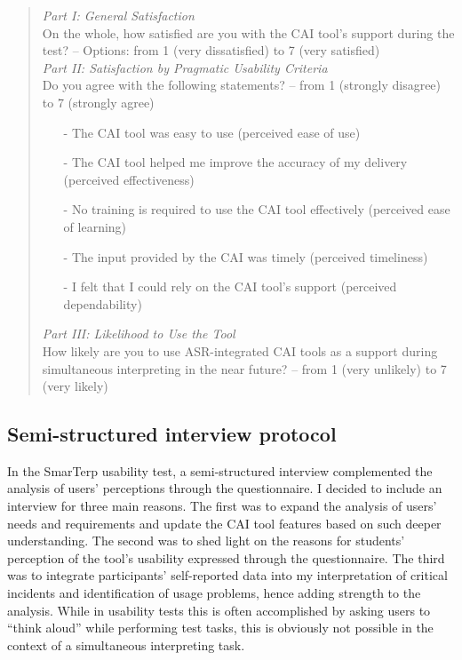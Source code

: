 \begin{quote}
    \textit{Part I: General Satisfaction}\\

On the whole, how satisfied are you with the CAI tool's support during the test?  --  Options: from 1 (very dissatisfied) to 7 (very satisfied)\\

\textit{Part II: Satisfaction by Pragmatic Usability Criteria}\\

Do you agree with the following statements?  --  from 1 (strongly disagree) to 7 (strongly agree)
\begin{itemize}
    \item [-] The CAI tool was easy to use (perceived ease of use)
    \item [-] The CAI tool helped me improve the accuracy of my delivery (perceived effectiveness)
    \item [-] No training is required to use the CAI tool effectively (perceived ease of learning)
    \item [-] The input provided by the CAI was timely (perceived timeliness)
    \item [-] I felt that I could rely on the CAI tool's support (perceived dependability)
\end{itemize}

\bigskip
\textit{Part III: Likelihood to Use the Tool}\\

How likely are you to use ASR-integrated CAI tools as a support during simultaneous interpreting in the near future?  --  from 1 (very unlikely) to 7 (very likely)

\end{quote}




\subsection{Semi-structured interview protocol}

In the SmarTerp usability test, a semi-structured interview complemented the analysis of users’ perceptions through the questionnaire. I decided to include an interview for three main reasons. The first was to expand the analysis of users’ needs and requirements and update the CAI tool features based on such deeper understanding. The second was to shed light on the reasons for students’ perception of the tool’s usability expressed through the questionnaire. The third was to integrate participants’ self-reported data into my interpretation of critical incidents and identification of usage problems, hence adding strength to the analysis. While in usability tests this is often accomplished by asking users to ``think aloud'' while performing test tasks, this is obviously not possible in the context of a simultaneous interpreting task.

